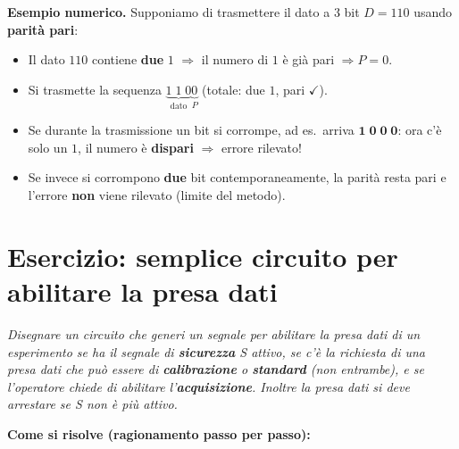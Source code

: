 \documentclass[11pt,a4paper]{report}
\begin{document}
\medskip
\noindent\textbf{Esempio numerico.} Supponiamo di trasmettere il dato a 3 bit $D = 110$ usando \textbf{parità pari}:
\begin{itemize}[leftmargin=1.5em]
    \item Il dato $110$ contiene \textbf{due} $1$ $\Rightarrow$ il numero di $1$ è già pari $\Rightarrow P = 0$.
    \item Si trasmette la sequenza $\underbrace{1\;1\;0}_{\text{dato}}\underbrace{0}_{P}$ (totale: due $1$, pari $\checkmark$).
    \item Se durante la trasmissione un bit si corrompe, ad es.\ arriva $\mathbf{1\;0\;0\;0}$: ora c'è solo un $1$, il numero è \textbf{dispari} $\Rightarrow$ errore rilevato!
    \item Se invece si corrompono \textbf{due} bit contemporaneamente, la parità resta pari e l'errore \textbf{non} viene rilevato (limite del metodo).
\end{itemize}

\section{Esercizio: semplice circuito per abilitare la presa dati}

\textit{Disegnare un circuito che generi un segnale per abilitare la presa dati di un esperimento se ha il segnale di \textbf{sicurezza} S attivo, se c'è la richiesta di una presa dati che può essere di \textbf{calibrazione} o \textbf{standard} (non entrambe), e se l'operatore chiede di abilitare l'\textbf{acquisizione}. Inoltre la presa dati si deve arrestare se S non è più attivo.}

\medskip
\noindent\textbf{Come si risolve (ragionamento passo per passo):}
\end{document}
